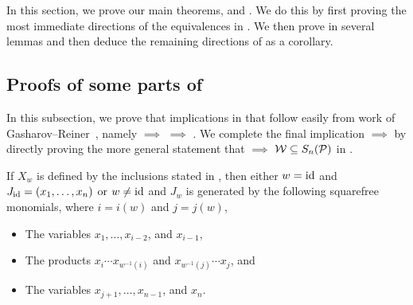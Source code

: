 In this section, we prove our main theorems,  and . We do this by first proving the most immediate directions of the equivalences in . We then prove  in several lemmas and then deduce the remaining directions of  as a corollary.

\subsection{Proofs of some parts of \texorpdfstring{}{Theorem A}}

In this subsection, we prove that implications in  that follow easily from work of Gasharov--Reiner~\cite{GasharovReiner}, namely  $\implies$  $\implies$ . We complete the final implication  $\implies$  by directly proving the more general statement that  $\implies$ $\mathcal{W}\subseteq S_n(\mathcal{P})$ in .


\begin{lemma}
\label{lem: A3 implies A1}
    If $X_w$ is defined by the inclusions stated in , then either $w=\mathrm{id}$ and $J_{\mathrm{id}}=(x_1,\dots, x_n)$ or $w\neq \mathrm{id}$ and $J_w$ is generated by the following squarefree monomials, where $i = i(w)$ and $j=j(w)$,
    \begin{itemize}
        \item The variables $x_1,\dots,x_{i-2}$, and $x_{i-1}$,
        \item The products $x_i\cdots x_{w^{-1}(i)}$ and $x_{w^{-1}(j)}\cdots x_j$, and
        \item The variables $x_{j+1},\dots,x_{n-1}$, and $x_n$.
    \end{itemize}
\end{lemma}

